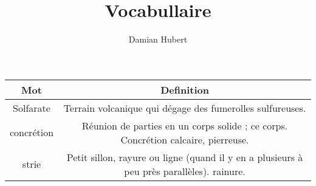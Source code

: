 \documentclass{article}
\author{Damian Hubert}
\title{Vocabullaire}
\begin{document}
\maketitle

\begin{table}[H]
	\centering
	\label{tab:label}

	\begin{tabular}{|c|c|}
		\hline
		Mot & Definition \\
		\hline
		Solfarate &  Terrain volcanique qui dégage des fumerolles sulfureuses. \\
		\hline
		concrétion &  Réunion de parties en un corps solide ; ce corps. Concrétion calcaire, pierreuse. \\
		\hline
		strie & Petit sillon, rayure ou ligne (quand il y en a plusieurs à peu près parallèles). rainure. \\
		\hline

		
	\end{tabular}
\end{table}
\end{document}

